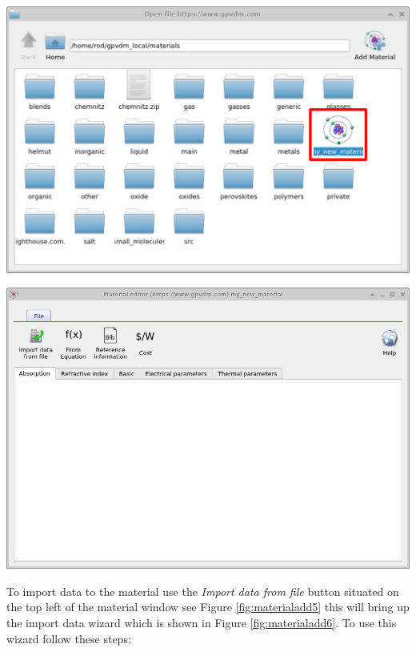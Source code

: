 \begin{minipage}{0.5\textwidth}
	\centering
	\includegraphics[width=\linewidth,height=0.8\linewidth]{./images/database_materials/database_materials_open.png}
	\label{fig:materialadd4}
\end{minipage}
\hspace{4pt}
\begin{minipage}[]{0.5\linewidth}
	\centering
	\includegraphics[width=\linewidth,height=0.6\linewidth]{./images/database_materials/database_window.png}
	\label{fig:materialadd5}
\end{minipage}

To import data to the material use the \emph{Import data from file} button situated on the top left of the material window see Figure \ref{fig:materialadd5} this will bring up the import data wizard which is shown in Figure \ref{fig:materialadd6}. To use this wizard follow these steps:


